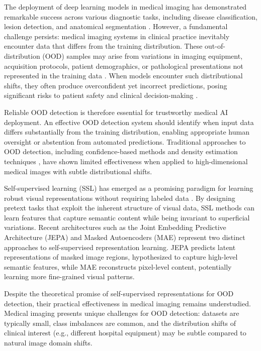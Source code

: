 \documentclass[11pt,a4paper]{article}
\begin{document}
The deployment of deep learning models in medical imaging has demonstrated remarkable success across various diagnostic tasks, including disease classification, lesion detection, and anatomical segmentation \citep{litjens2017survey}. However, a fundamental challenge persists: medical imaging systems in clinical practice inevitably encounter data that differs from the training distribution. These out-of-distribution (OOD) samples may arise from variations in imaging equipment, acquisition protocols, patient demographics, or pathological presentations not represented in the training data \citep{castro2020causality}. When models encounter such distributional shifts, they often produce overconfident yet incorrect predictions, posing significant risks to patient safety and clinical decision-making \citep{kompa2021second}.

Reliable OOD detection is therefore essential for trustworthy medical AI deployment. An effective OOD detection system should identify when input data differs substantially from the training distribution, enabling appropriate human oversight or abstention from automated predictions. Traditional approaches to OOD detection, including confidence-based methods \citep{hendrycks2017baseline} and density estimation techniques \citep{ren2019likelihood}, have shown limited effectiveness when applied to high-dimensional medical images with subtle distributional shifts.

Self-supervised learning (SSL) has emerged as a promising paradigm for learning robust visual representations without requiring labeled data \citep{chen2020simple, he2020momentum}. By designing pretext tasks that exploit the inherent structure of visual data, SSL methods can learn features that capture semantic content while being invariant to superficial variations. Recent architectures such as the Joint Embedding Predictive Architecture (JEPA) \citep{assran2023self} and Masked Autoencoders (MAE) \citep{he2022masked} represent two distinct approaches to self-supervised representation learning. JEPA predicts latent representations of masked image regions, hypothesized to capture high-level semantic features, while MAE reconstructs pixel-level content, potentially learning more fine-grained visual patterns.

Despite the theoretical promise of self-supervised representations for OOD detection, their practical effectiveness in medical imaging remains understudied. Medical imaging presents unique challenges for OOD detection: datasets are typically small, class imbalances are common, and the distribution shifts of clinical interest (e.g., different hospital equipment) may be subtle compared to natural image domain shifts.
\end{document}
